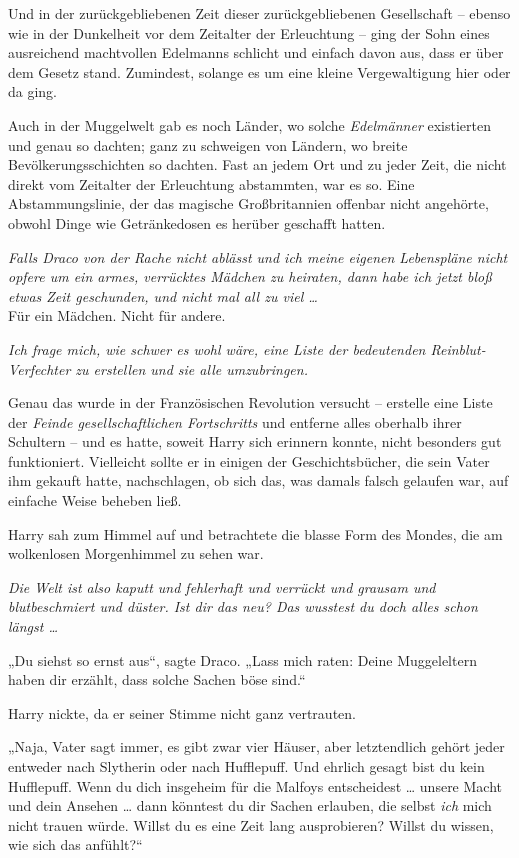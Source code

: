 {Und in der zurückgebliebenen Zeit dieser zurückgebliebenen Gesellschaft -- ebenso wie in der Dunkelheit vor dem Zeitalter der Erleuchtung -- ging der Sohn eines ausreichend machtvollen Edelmanns schlicht und einfach davon aus, dass er über dem Gesetz stand. Zumindest, solange es um eine kleine Vergewaltigung hier oder da ging.

Auch in der Muggelwelt gab es noch Länder, wo solche \emph{Edelmänner} existierten und genau so dachten; ganz zu schweigen von Ländern, wo breite Bevölkerungsschichten so dachten. Fast an jedem Ort und zu jeder Zeit, die nicht direkt vom Zeitalter der Erleuchtung abstammten, war es so. Eine Abstammungslinie, der das magische Großbritannien offenbar nicht angehörte, obwohl Dinge wie Getränkedosen es herüber geschafft hatten.

\emph{Falls Draco von der Rache nicht ablässt und ich meine eigenen Lebenspläne nicht opfere um ein armes, verrücktes Mädchen zu heiraten, dann habe ich jetzt bloß etwas Zeit geschunden, und nicht mal all zu viel …}\\ Für ein Mädchen. Nicht für andere.

\emph{Ich frage mich, wie schwer es wohl wäre, eine Liste der bedeutenden Reinblut-Verfechter zu erstellen und sie alle umzubringen.}

Genau das wurde in der Französischen Revolution versucht -- erstelle eine Liste der \emph{Feinde gesellschaftlichen Fortschritts} und entferne alles oberhalb ihrer Schultern -- und es hatte, soweit Harry sich erinnern konnte, nicht besonders gut funktioniert. Vielleicht sollte er in einigen der Geschichtsbücher, die sein Vater ihm gekauft hatte, nachschlagen, ob sich das, was damals falsch gelaufen war, auf einfache Weise beheben ließ.

Harry sah zum Himmel auf und betrachtete die blasse Form des Mondes, die am wolkenlosen Morgenhimmel zu sehen war.

\emph{Die Welt ist also kaputt und fehlerhaft und verrückt und grausam und blutbeschmiert und düster. Ist dir das neu? Das wusstest du doch alles schon längst …}

„Du siehst so ernst aus“, sagte Draco. „Lass mich raten: Deine Muggeleltern haben dir erzählt, dass solche Sachen böse sind.“

Harry nickte, da er seiner Stimme nicht ganz vertrauten.

„Naja, Vater sagt immer, es gibt zwar vier Häuser, aber letztendlich gehört jeder entweder nach Slytherin oder nach Hufflepuff. Und ehrlich gesagt bist du kein Hufflepuff. Wenn du dich insgeheim für die Malfoys entscheidest … unsere Macht und dein Ansehen … dann könntest du dir Sachen erlauben, die selbst \emph{ich} mich nicht trauen würde. Willst du es eine Zeit lang ausprobieren? Willst du wissen, wie sich das anfühlt?“

}
